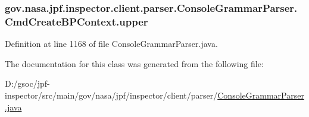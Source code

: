 \subsubsection[{\texorpdfstring{upper}{upper}}]{ gov.\+nasa.\+jpf.\+inspector.\+client.\+parser.\+Console\+Grammar\+Parser.\+Cmd\+Create\+B\+P\+Context.\+upper}\hypertarget{classgov_1_1nasa_1_1jpf_1_1inspector_1_1client_1_1parser_1_1_console_grammar_parser_1_1_cmd_create_b_p_context_af5f402cb7d391bf6e436db5efb4e8b94}{}\label{classgov_1_1nasa_1_1jpf_1_1inspector_1_1client_1_1parser_1_1_console_grammar_parser_1_1_cmd_create_b_p_context_af5f402cb7d391bf6e436db5efb4e8b94}


Definition at line 1168 of file Console\+Grammar\+Parser.\+java.



The documentation for this class was generated from the following file\+:\begin{DoxyCompactItemize}
\item 
D\+:/gsoc/jpf-\/inspector/src/main/gov/nasa/jpf/inspector/client/parser/\hyperlink{_console_grammar_parser_8java}{Console\+Grammar\+Parser.\+java}\end{DoxyCompactItemize}
